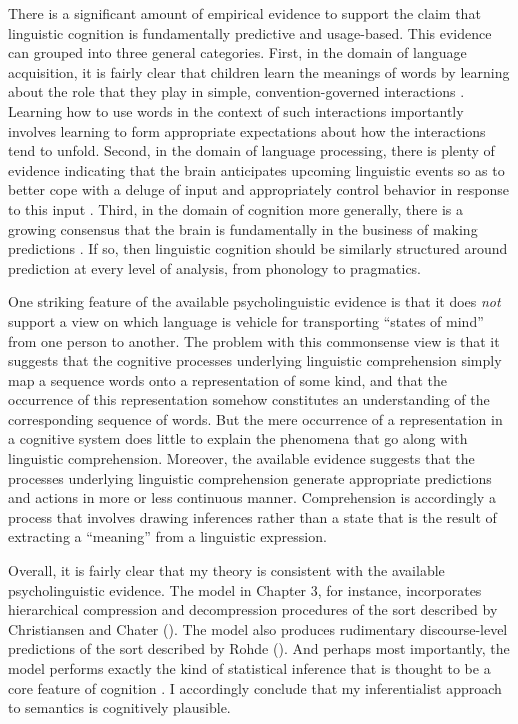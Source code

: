 There is a significant amount of empirical evidence to support the claim that linguistic cognition is fundamentally predictive and usage-based. This evidence can grouped into three general categories. First, in the domain of language acquisition, it is fairly clear that children learn the meanings of words by learning about the role that they play in simple, convention-governed interactions \citep{Tomasello:2005,Tomasello:2001}. Learning how to use words in the context of such interactions importantly involves learning to form appropriate expectations about how the interactions tend to unfold. Second, in the domain of language processing, there is plenty of evidence indicating that the brain anticipates upcoming linguistic events so as to better cope with a deluge of input and appropriately control behavior in response to this input \citep{Christiansen:2015,Pickering:2007,Pickering:2013}. Third, in the domain of cognition more generally, there is a growing consensus that the brain is fundamentally in the business of making predictions \citep{clark:2013}. If so, then linguistic cognition should be similarly structured around prediction at every level of analysis, from phonology to pragmatics. 

One striking feature of the available psycholinguistic evidence is that it does \textit{not} support a view on which language is vehicle for transporting ``states of mind'' from one person to another. The problem with this commonsense view is that it suggests that the cognitive processes underlying linguistic comprehension simply map a sequence words onto a representation of some kind, and that the occurrence of this representation somehow constitutes an understanding of the corresponding sequence of words. But the mere occurrence of a representation in a cognitive system does little to explain the phenomena that go along with linguistic comprehension. Moreover, the available evidence suggests that the processes underlying linguistic comprehension generate appropriate predictions and actions in more or less continuous manner. Comprehension is accordingly a process that involves drawing inferences rather than a state that is the result of extracting a ``meaning'' from a linguistic expression.

Overall, it is fairly clear that my theory is consistent with the available psycholinguistic evidence. The model in Chapter 3, for instance, incorporates hierarchical compression and decompression procedures of the sort described by Christiansen and Chater (\citeyear{Christiansen:2015}). The model also produces rudimentary discourse-level predictions of the sort described by Rohde (\citeyear{Rohde:2008}). And perhaps most importantly, the model performs exactly the kind of statistical inference that is thought to be a core feature of cognition \citep{Eliasmith:2007,clark:2013}. I accordingly conclude that my inferentialist approach to semantics is cognitively plausible.  

